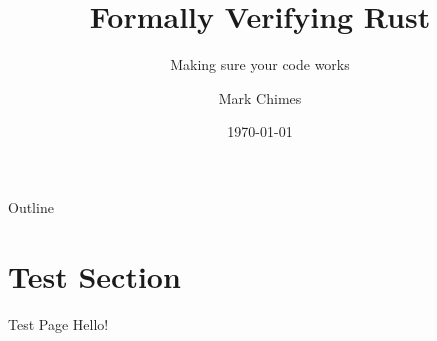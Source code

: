 \documentclass{beamer}
\title{Formally Verifying Rust}
\subtitle{Making sure your code works}
\author{Mark Chimes}
\date{\today}
\begin{document}
\begin{frame}
    \titlepage
\end{frame}

\begin{frame}{Outline}
\tableofcontents
\end{frame}

\section{Test Section}
\begin{frame}{Test Page}
Hello!
\end{frame}
\end{document}
